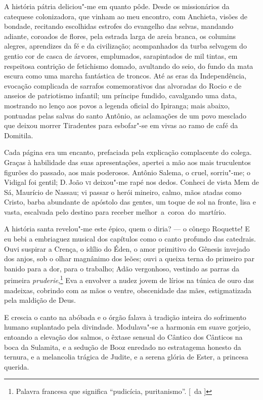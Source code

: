A história pátria deliciou"-me em quanto pôde. Desde os missionários da 
catequese colonizadora, que vinham ao meu encontro, com Anchieta, visões de
bondade, recitando escolhidas estrofes do evangelho das selvas,
mandando adiante, coroados de flores, pela estrada larga de areia
branca, os columins alegres, aprendizes da fé e da civilização;
acompanhados da turba selvagem do gentio cor de casca de árvores,
emplumados, sarapintados de mil tintas, em respeitosa contrição de
fetichismo domado, avultando do seio, do fundo da mata escura como uma
marcha fantástica de troncos. Até as eras da Independência, evocação
complicada de sarrafos comemorativos das alvoradas do Rocio e de
anseios de patriotismo infantil; um príncipe fundido, cavalgando uma
data, mostrando no lenço aos povos a legenda oficial do Ipiranga; mais
abaixo, pontuadas pelas salvas do santo Antônio, as aclamações de um
povo mesclado que deixou morrer Tiradentes para esbofar"-se em vivas
ao ramo de café da Domitila. 

Cada página era um encanto, prefaciada pela explicação
complacente do colega. Graças à habilidade das suas apresentações,
apertei a mão aos mais truculentos figurões do passado, aos mais
poderosos. Antônio Salema, o cruel, sorriu"-me; o Vidigal foi gentil;
D.\,João \textsc{vi} deixou"-me rapé nos dedos. Conheci de vista Mem de Sá,
Maurício de Nassau; vi passar o herói mineiro, calmo, mãos atadas como
Cristo, barba abundante de apóstolo das gentes, um toque de sol na
fronte, lisa e vasta, escalvada pelo destino para receber \mbox{melhor a
coroa do martírio.} 

A história santa revelou"-me este épico, quem o
diria? --- o cônego Roquette! E eu bebi a embriaguez musical dos
capítulos como o canto profundo das catedrais. Ouvi suspirar a Crença,
o idílio do Éden, o amor primitivo do Gênesis invejado dos anjos, sob o
olhar magnânimo dos leões; ouvi a queixa terna do primeiro par banido
para a dor, para o trabalho; Adão vergonhoso, vestindo as parras da
primeira \textit{pruderie},\footnote{ Palavra francesa que significa ``pudicícia, puritanismo''. [~da ]} Eva a envolver a nudez jovem de lírios na túnica de
ouro das madeixas, cobrindo com as mãos o ventre, obscenidade das mães,
estigmatizada pela maldição de Deus. 


E crescia o canto na abóbada e o
órgão falava à tradição inteira do sofrimento humano suplantado pela
divindade. Modulava"-se a harmonia em suave gorjeio, entoando a
elevação dos salmos, o êxtase sensual do Cântico dos Cânticos na boca
da Sulamita, e a sedução de Booz enredado no estratagema honesto da
ternura, e a melancolia trágica de Judite, e a serena glória de Ester,
a princesa querida. 

